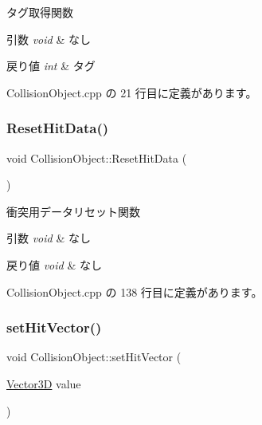 タグ取得関数 


\begin{DoxyParams}{引数}
{\em void} & なし \\
\hline
\end{DoxyParams}

\begin{DoxyRetVals}{戻り値}
{\em int} & タグ \\
\hline
\end{DoxyRetVals}


 Collision\+Object.\+cpp の 21 行目に定義があります。

\mbox{\label{class_collision_object_a92dd5d21c6674605d290e0d37d64505a}} 
\subsubsection{\texorpdfstring{Reset\+Hit\+Data()}{ResetHitData()}}
{\footnotesize\ttfamily void Collision\+Object\+::\+Reset\+Hit\+Data (\begin{DoxyParamCaption}{ }\end{DoxyParamCaption})}



衝突用データリセット関数 


\begin{DoxyParams}{引数}
{\em void} & なし \\
\hline
\end{DoxyParams}

\begin{DoxyRetVals}{戻り値}
{\em void} & なし \\
\hline
\end{DoxyRetVals}


 Collision\+Object.\+cpp の 138 行目に定義があります。

\mbox{\label{class_collision_object_a1087fa9cebfe0b1675923807b73d8868}} 
\subsubsection{\texorpdfstring{set\+Hit\+Vector()}{setHitVector()}}
{\footnotesize\ttfamily void Collision\+Object\+::set\+Hit\+Vector (\begin{DoxyParamCaption}\item[{\mbox{\hyperlink{class_vector3_d}{Vector3D}}}]{value }\end{DoxyParamCaption})}



